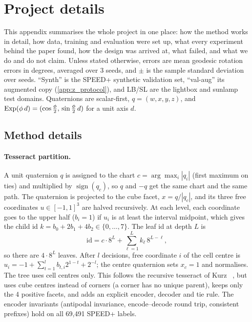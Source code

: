 \section{Project details}\label{app:details}
This appendix summarises the whole project in one place: how the method works in detail, how data, training and evaluation were set up, what every experiment behind the paper found, how the design was arrived at, what failed, and what we do and do not claim. Unless stated otherwise, errors are mean geodesic rotation errors in degrees, averaged over 3 seeds, and $\pm$ is the sample standard deviation over seeds. ``Synth'' is the SPEED+ synthetic validation set, ``val-aug'' its augmented copy (\cref{app:z_protocol}), and LB/SL are the lightbox and sunlamp test domains. Quaternions are scalar-first, $q=(w,x,y,z)$, and $\mathrm{Exp}(\phi\,d)=(\cos\tfrac{\phi}{2},\,\sin\tfrac{\phi}{2}\,d)$ for a unit axis $d$.

\subsection{Method details}\label{app:z_method}

\paragraph{Tesseract partition.}
A unit quaternion $q$ is assigned to the chart $c=\arg\max_i|q_i|$ (first maximum on ties) and multiplied by $\operatorname{sign}(q_c)$, so $q$ and $-q$ get the same chart and the same path. The quaternion is projected to the cube facet, $x=q/|q_c|$, and its three free coordinates $u\in[-1,1]^3$ are halved recursively. At each level, each coordinate goes to the upper half ($b_i=1$) if $u_i$ is at least the interval midpoint, which gives the child id $k=b_0+2b_1+4b_2\in\{0,\dots,7\}$. The leaf id at depth $L$ is
\begin{equation}
  \mathrm{id}=c\cdot 8^L+\textstyle\sum_{\ell=1}^{L}k_{\ell}\,8^{L-\ell},
\end{equation}
so there are $4\cdot 8^L$ leaves. After $l$ decisions, free coordinate $i$ of the cell centre is $u_i=-1+\sum_{t=1}^{l}b_{t,i}2^{1-t}+2^{-l}$; the centre quaternion sets $x_c=1$ and normalises. The tree uses cell centres only. This follows the recursive tesseract of Kurz \etal~\cite{kurz2017tesseract}, but uses cube centres instead of corners (a corner has no unique parent), keeps only the 4 positive facets, and adds an explicit encoder, decoder and tie rule. The encoder invariants (antipodal invariance, encode--decode round trip, consistent prefixes) hold on all 69,491 SPEED+ labels.

